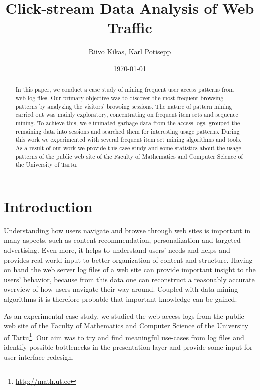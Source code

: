 \documentclass[12pt, english,a4paper]{article}
\begin{document}
\title{Click-stream Data Analysis of Web Traffic}
\author{Riivo Kikas, Karl Potisepp}
\date{\today}
\maketitle


\begin{abstract}
In this paper, we conduct a case study of mining frequent user access patterns from web log files. Our primary objective was to discover the most frequent browsing patterns by analyzing the visitors' browsing sessions. The nature of pattern mining carried out was mainly exploratory, concentrating on frequent item sets and sequence mining. To achieve this, we eliminated garbage data from the access logs, grouped the remaining data into sessions and searched them for interesting usage patterns. During this work we experimented with several frequent item set mining algorithms and tools. As a result of our work we provide this case study and some statistics about the usage patterns of the public web site of the Faculty of Mathematics and Computer Science of the University of Tartu.
\end{abstract}


\tableofcontents


\section{Introduction} 
Understanding how users navigate and browse through web sites is important in many aspects, such as content recommendation,
personalization and targeted advertising. Even more, it helps to understand users' needs and helps and provides real world input to better organization of content and structure. Having on hand the web server log files of a web site can provide important insight to the users' behavior, because from this data one can reconstruct a reasonably accurate overview of how users navigate their way around. Coupled with data mining algorithms it is therefore probable that important knowledge can be gained.

As an experimental case study, we studied the web access logs from the public web site of the Faculty of Mathematics and Computer Science of the University of Tartu\footnote{\url{http://math.ut.ee}}. Our aim was to try and find meaningful use-cases from log files and identify possible bottlenecks in the presentation layer and provide some input for user interface redesign.
\end{document}
